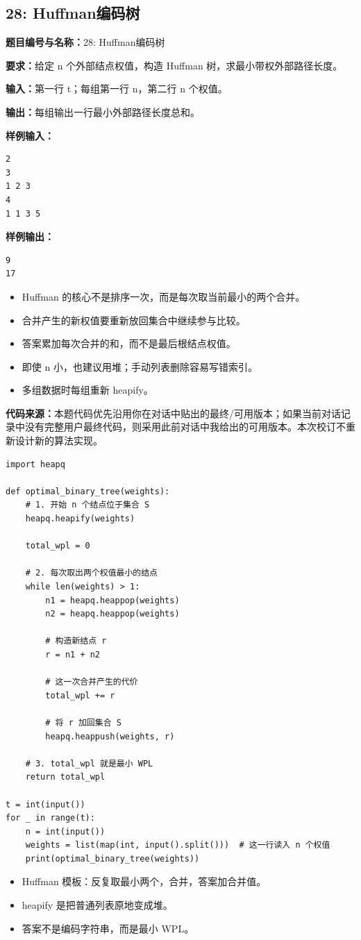 \documentclass[10pt,a4paper,fontset=none]{ctexart}
\newcommand{\codesource}{\par\noindent\textbf{代码来源：}本题代码优先沿用你在对话中贴出的最终/可用版本；如果当前对话记录中没有完整用户最终代码，则采用此前对话中我给出的可用版本。本次校订不重新设计新的算法实现。\par\vspace{0.2em}}
\begin{document}
\subsection{28: Huffman编码树}
\begin{taskbox}
\textbf{题目编号与名称：}28: Huffman编码树\par
\textbf{要求：}给定 n 个外部结点权值，构造 Huffman 树，求最小带权外部路径长度。\par
\textbf{输入：}第一行 t；每组第一行 n，第二行 n 个权值。\par
\textbf{输出：}每组输出一行最小外部路径长度总和。\par
\textbf{样例输入：}
\begin{lstlisting}[style=sample]
2
3
1 2 3
4
1 1 3 5
\end{lstlisting}
\textbf{样例输出：}
\begin{lstlisting}[style=sample]
9
17
\end{lstlisting}
\end{taskbox}
\begin{mistakebox}
\begin{itemize}
  \item Huffman 的核心不是排序一次，而是每次取当前最小的两个合并。
  \item 合并产生的新权值要重新放回集合中继续参与比较。
  \item 答案累加每次合并的和，而不是最后根结点权值。
  \item 即使 n 小，也建议用堆；手动列表删除容易写错索引。
  \item 多组数据时每组重新 heapify。
\end{itemize}
\end{mistakebox}
\codesource
\begin{lstlisting}[style=py,caption={最终可用代码（对话来源）}]
import heapq

def optimal_binary_tree(weights):
    # 1. 开始 n 个结点位于集合 S
    heapq.heapify(weights)

    total_wpl = 0

    # 2. 每次取出两个权值最小的结点
    while len(weights) > 1:
        n1 = heapq.heappop(weights)
        n2 = heapq.heappop(weights)

        # 构造新结点 r
        r = n1 + n2

        # 这一次合并产生的代价
        total_wpl += r

        # 将 r 加回集合 S
        heapq.heappush(weights, r)

    # 3. total_wpl 就是最小 WPL
    return total_wpl

t = int(input())
for _ in range(t):
    n = int(input())
    weights = list(map(int, input().split()))  # 这一行读入 n 个权值
    print(optimal_binary_tree(weights))
\end{lstlisting}
\begin{notebox}
\begin{itemize}
  \item Huffman 模板：反复取最小两个，合并，答案加合并值。
  \item heapify 是把普通列表原地变成堆。
  \item 答案不是编码字符串，而是最小 WPL。
\end{itemize}
\end{notebox}
\end{document}
